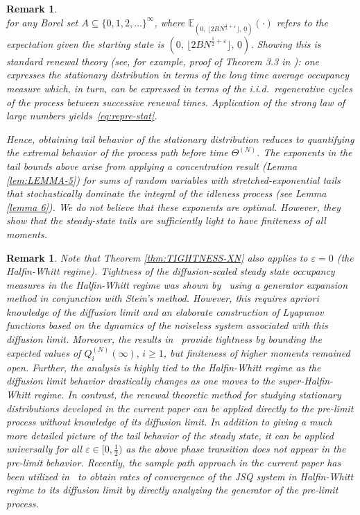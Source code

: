 \documentclass[11pt, reqno]{article}
\newtheorem{remark}[theorem]{Remark}
\numberwithin{equation}{section}
\numberwithin{theorem}{section}
\newcommand\blue[1]{#1}
\begin{document}
\begin{remark}
\begin{equation}
\end{equation}
for any Borel set $A \subseteq \{0,1,2,\ldots\}^{\infty}$, where $\mathbb{E}_{(0, \, \lfloor 2BN^{\frac{1}{2}+\varepsilon} \rfloor, \,\underline{0})}(\cdot)$ refers to the expectation given the starting state is $(0, \, \lfloor 2BN^{\frac{1}{2}+\varepsilon} \rfloor, \,\underline{0})$. 
Showing this is standard renewal theory (see, for example, proof of Theorem 3.3 in \cite{BM19a}): one expresses the stationary distribution in terms of the long time average occupancy measure which, in turn, can be expressed in terms of the i.i.d.~regenerative cycles of the process between successive renewal times. Application of the strong law of large numbers yields~\eqref{eq:repre-stat}.

Hence, obtaining tail behavior of the stationary distribution reduces to quantifying the extremal behavior of the process path before time $\Theta^{(N)}$. \blue{The exponents  in the tail bounds above arise from applying a concentration result (Lemma \ref{lem:LEMMA-5}) for sums of random variables with stretched-exponential tails that stochastically dominate the integral of the idleness process (see Lemma \ref{lemma 6}).
We do not believe that these exponents are optimal.
However, they show that the steady-state tails are sufficiently light to have finiteness of all moments.}
\bigskip
\end{remark}

\begin{remark} Note that Theorem \ref{thm:TIGHTNESS-XN} also applies to $\varepsilon =0$ (the Halfin-Whitt regime). Tightness of the diffusion-scaled steady state occupancy measures in the Halfin-Whitt regime was shown by~\cite{Braverman18} using a generator expansion method in conjunction with Stein's method. However, this requires apriori knowledge of the diffusion limit and an elaborate construction of Lyapunov functions based on the dynamics of the noiseless system associated with this diffusion limit. Moreover, the results in~\cite{Braverman18} provide tightness by bounding the expected values of $Q^{(N)}_i(\infty), \, i \ge 1$, but finiteness of higher moments remained open. Further, the analysis is highly tied to the Halfin-Whitt regime as the diffusion limit behavior drastically changes as one moves to the super-Halfin-Whitt regime.
In contrast, the renewal theoretic method for studying stationary distributions developed in the current paper can be applied directly to the pre-limit process without knowledge of its diffusion limit. In addition to giving a much more detailed picture of the tail behavior of the steady state, it can be applied universally for all $\varepsilon \in [0, \frac{1}{2})$ as the above phase transition does not appear in the pre-limit behavior. Recently, the sample path approach in the current paper has been utilized in~\cite{braverman2022join} to obtain rates of convergence of the JSQ system in Halfin-Whitt regime to its diffusion limit by directly analyzing the generator of the pre-limit process.
\end{remark}
\end{document}
